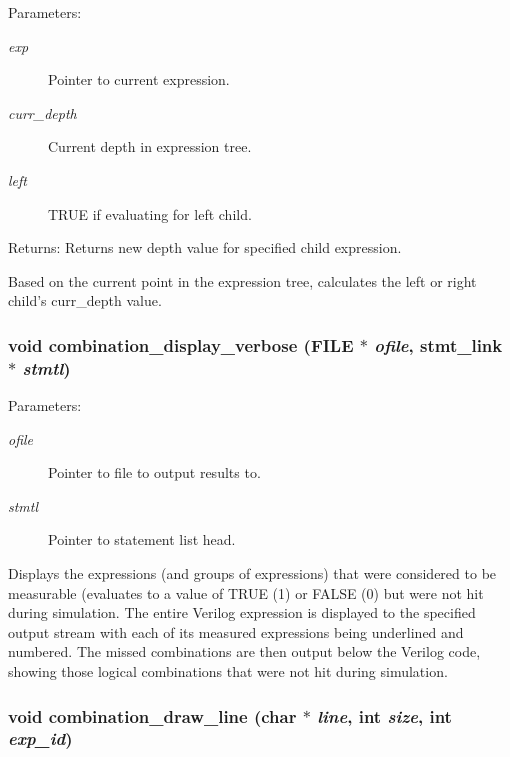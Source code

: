 \begin{Desc}
\item[Parameters:]
\begin{description}
\item[{\em exp}]Pointer to current expression. \item[{\em curr\_\-depth}]Current depth in expression tree. \item[{\em left}]TRUE if evaluating for left child.\end{description}
\end{Desc}
\begin{Desc}
\item[Returns:]Returns new depth value for specified child expression.\end{Desc}
Based on the current point in the expression tree, calculates the left or right child's curr\_\-depth value. 
\subsubsection{\setlength{\rightskip}{0pt plus 5cm}void combination\_\-display\_\-verbose (FILE $\ast$ {\em ofile}, {\bf stmt\_\-link} $\ast$ {\em stmtl})}\label{comb_8c_a17}


\begin{Desc}
\item[Parameters:]
\begin{description}
\item[{\em ofile}]Pointer to file to output results to. \item[{\em stmtl}]Pointer to statement list head.\end{description}
\end{Desc}
Displays the expressions (and groups of expressions) that were considered to be measurable (evaluates to a value of TRUE (1) or FALSE (0) but were not hit during simulation. The entire Verilog expression is displayed to the specified output stream with each of its measured expressions being underlined and numbered. The missed combinations are then output below the Verilog code, showing those logical combinations that were not hit during simulation. 
\subsubsection{\setlength{\rightskip}{0pt plus 5cm}void combination\_\-draw\_\-line (char $\ast$ {\em line}, int {\em size}, int {\em exp\_\-id})}\label{comb_8c_a10}


